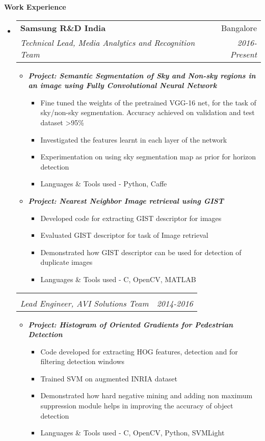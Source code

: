 \documentclass[letterpaper,11pt]{article}
\makeatletter
\def\CC{{C\nolinebreak[4]\hspace{-.05em}\raisebox{.4ex}{\tiny\bf ++}}}
\newcommand{\resitem}[1]{\item #1 \vspace{-2pt}}
\newcommand{\resheading}[1]{{\large \colorbox{mygrey}{\begin{minipage}{\textwidth}{\textbf{#1 \vphantom{p\^{E}}}}\end{minipage}}}}
\newcommand{\ressubheading}[4]{
	\begin{tabular*}{7.0in}{l@{\extracolsep{\fill}}r}
		\textbf{#1} & #2 \\
		\textit{#3} & \textit{#4} \\
	\end{tabular*}\vspace{-6pt}}
\makeatother
\begin{document}
\resheading{Work Experience}
\begin{itemize}
	\item
		\ressubheading{Samsung R\&D India}{Bangalore}{Technical Lead, Media Analytics and Recognition Team}{2016-Present}
		\vspace{1mm}
		\begin{itemize}
				\resitem[]{\faCircleO
					\hspace{1mm}\textbf{\emph{Project: Semantic Segmentation of Sky and Non-sky regions in an image using Fully Convolutional Neural Network}}}
				\begin{itemize}
						\resitem{Fine tuned the weights of the pretrained VGG-16 net, for the task of sky/non-sky segmentation. Accuracy achieved on validation and test dataset >95\%}
						\resitem{Investigated the features learnt in each layer of the network}
						\resitem{Experimentation on using sky segmentation map as prior for horizon detection}
						\resitem{Languages \& Tools used - Python, Caffe}
				\end{itemize}
				\vspace{1mm}
				\resitem[]{\faCircleO \hspace{1mm}\textbf{\emph{Project: Nearest Neighbor Image retrieval using GIST}}}
				\begin{itemize}
						\resitem{Developed code for extracting GIST descriptor for images}
						\resitem{Evaluated GIST descriptor for task of Image retrieval}
						\resitem{Demonstrated how GIST descriptor can be used for detection of duplicate images }
						\resitem{Languages \& Tools used - \CC, OpenCV, MATLAB}
				\end{itemize}
		\end{itemize}
		\ressubheading{}{}{Lead Engineer, AVI Solutions Team}{2014-2016}
		\vspace{1mm}
		\begin{itemize}
				\resitem[]{\faCircleO \hspace{1mm}\textbf{\emph{Project: Histogram of Oriented Gradients for Pedestrian Detection}}}
				\begin{itemize}
						\resitem{Code developed for extracting HOG features, detection and for filtering detection windows}
						\resitem{Trained SVM on augmented INRIA dataset }
						\resitem{Demonstrated how hard negative mining and adding non maximum suppression module helps in improving the accuracy of object detection}
						\resitem{Languages \& Tools used - \CC, OpenCV, Python, SVMLight}
				\end{itemize}


\end{itemize}
\end{itemize}
\end{document}

